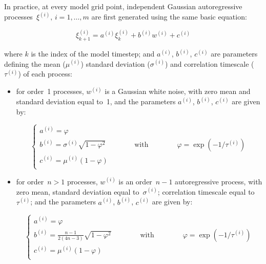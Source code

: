 \documentclass[../tex_main/NEMO_manual]{subfiles}
\begin{document}
In practice, at every model grid point, independent Gaussian autoregressive
processes~$\xi^{(i)},\,i=1,\ldots,m$ are first generated
using the same basic equation:

\begin{equation}
\label{eq:autoreg}
\xi^{(i)}_{k+1} = a^{(i)} \xi^{(i)}_k + b^{(i)} w^{(i)} + c^{(i)}
\end{equation}

\noindent
where $k$ is the index of the model timestep; and
$a^{(i)}$, $b^{(i)}$, $c^{(i)}$ are parameters defining
the mean ($\mu^{(i)}$) standard deviation ($\sigma^{(i)}$)
and correlation timescale ($\tau^{(i)}$) of each process:

\begin{itemize}
\item for order~1 processes, $w^{(i)}$ is a Gaussian white noise,
with zero mean and standard deviation equal to~1, and the parameters
$a^{(i)}$, $b^{(i)}$, $c^{(i)}$ are given by:

\begin{equation}
\label{eq:ord1}
\left\{
\begin{array}{l}
a^{(i)} = \varphi \\
b^{(i)} = \sigma^{(i)} \sqrt{ 1 - \varphi^2 } 
 \qquad\qquad\mbox{with}\qquad\qquad
\varphi = \exp \left( - 1 / \tau^{(i)} \right) \\
c^{(i)} = \mu^{(i)} \left( 1 - \varphi \right) \\
\end{array}
\right.
\end{equation}

\item for order~$n>1$ processes, $w^{(i)}$ is an order~$n-1$ autoregressive process,
with zero mean, standard deviation equal to~$\sigma^{(i)}$; correlation timescale
equal to~$\tau^{(i)}$; and the parameters $a^{(i)}$, $b^{(i)}$, $c^{(i)}$ are given by:

\begin{equation}
\label{eq:ord2}
\left\{
\begin{array}{l}
a^{(i)} = \varphi \\
b^{(i)} = \frac{n-1}{2(4n-3)} \sqrt{ 1 - \varphi^2 } 
 \qquad\qquad\mbox{with}\qquad\qquad
\varphi = \exp \left( - 1 / \tau^{(i)} \right) \\
c^{(i)} = \mu^{(i)} \left( 1 - \varphi \right) \\
\end{array}
\right.
\end{equation}

\end{itemize}
\end{document}
